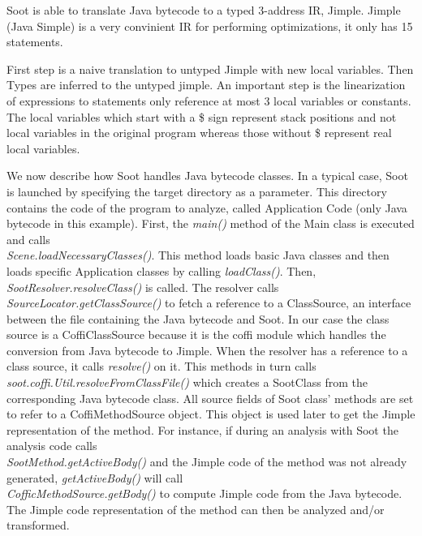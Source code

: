 \documentclass{dithesis}
\begin{document}
        Soot is able to translate Java bytecode to a typed 3-address IR, Jimple. Jimple (Java Simple) is a very convinient IR for performing optimizations, it only has 15 statements.

        First step is a naive translation to untyped Jimple with new local variables. Then Types are inferred to the untyped jimple. An important step is the linearization of expressions to statements only reference at most 3 local variables or constants. The local variables which start with a \$ sign represent stack positions and not local variables in the original program whereas those without \$ represent real local variables.
        
        We now describe how Soot handles Java bytecode classes. In a typical case, Soot is launched by specifying the target directory as a parameter. This directory contains the code of the program to analyze, called Application Code (only Java bytecode in this example). First, the \textit{main()} method of the Main class is executed and calls \\
        \textit{Scene.loadNecessaryClasses()}. This method loads basic Java classes and then loads specific Application classes by calling \textit{loadClass()}. Then, \textit{SootResolver.resolveClass()} is called. The resolver calls \\ 
        \textit{SourceLocator.getClassSource()} to fetch a reference to a ClassSource, an interface between the file containing the Java bytecode and Soot. In our case the class source is a CoffiClassSource because it is the coffi module which handles the conversion from Java bytecode to Jimple. When the resolver has a reference to a class source, it calls \textit{resolve()} on it. This methods in turn calls \\ \textit{soot.coffi.Util.resolveFromClassFile()} which creates a SootClass from the corresponding Java bytecode class. All source fields of Soot class’ methods are set to refer to a CoffiMethodSource object. This object is used later to get the Jimple representation of the method. For instance, if during an analysis with Soot the analysis code calls \\ \textit{SootMethod.getActiveBody()} and the Jimple code of the method was not already generated, \textit{getActiveBody()} will call \\ \textit{CofficMethodSource.getBody()} to compute Jimple code from the Java bytecode. The Jimple code representation of the method can then be analyzed and/or transformed.
\end{document}
